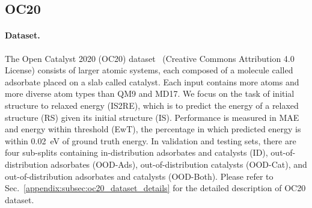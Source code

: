 \vspace{-3mm}
\subsection{OC20}
\vspace{-2mm}
\label{subsec:oc20}

\vspace{-1mm}
\paragraph{Dataset.}
The Open Catalyst 2020 (OC20) dataset~\citep{oc20} (Creative Commons Attribution 4.0 License) consists of larger atomic systems, each composed of a molecule called adsorbate placed on a slab called catalyst.
Each input contains more atoms and more diverse atom types than QM9 and MD17.
We focus on the task of initial structure to relaxed energy (IS2RE), which is to predict the energy of a relaxed structure (RS) given its initial structure (IS).
Performance is measured in MAE and energy within threshold (EwT), the percentage in which predicted energy is within 0.02~eV of ground truth energy.
In validation and testing sets, there are four sub-splits containing in-distribution adsorbates and catalysts (ID), out-of-distribution adsorbates (OOD-Ads), out-of-distribution catalysts (OOD-Cat), and out-of-distribution adsorbates and catalysts (OOD-Both). 
Please refer to Sec.~\ref{appendix:subsec:oc20_dataset_details} for the detailed description of OC20 dataset.

